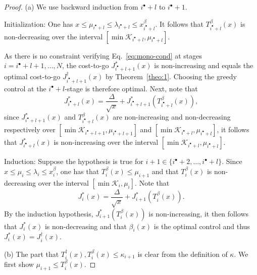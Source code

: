 \documentclass[journal]{IEEEtran}
\theoremstyle{plain}
\theoremstyle{definition}
\theoremstyle{definition}
\begin{document}
\begin{proof}
  (a) We use backward induction from $i^\bullet + l$ to
  $i^\bullet + 1$. %

  Initialization: One has
  $x \leq \mu_{i^\bullet + l} \leq \lambda_{i^\bullet + l} \leq
  x^\beta_{i^\bullet + l}$.
  It follows that $T_{i^\bullet + l}^{\beta}(x)$ is non-decreasing
  over the interval
  $[\min \mathcal{K}_{i^\bullet+l}, \mu_{i^\bullet+l}]$.

  As there is no constraint verifying Eq.~\eqref{eq:mono-cond} at
  stages $i=i^\bullet + l + 1, \dots, N$, the cost-to-go
  $J^*_{i^\bullet + l + 1}(x)$ is non-increasing and equals
  the optimal cost-to-go $J^\dagger_{i^\bullet + l + 1}(x)$
  by Theorem~\ref{theo:1}. Choosing the greedy control at the
  $i^\bullet+l$-stage is therefore optimal.  Next, note that
  \begin{equation}
    \label{eq:4b}
    J^{*}_{i^\bullet + l}(x) = \frac{\Delta}{\sqrt{x}}
    + J^{*}_{i^\bullet + l + 1}(T_{i^\bullet + l}^\beta(x)),
  \end{equation}
  since $J^{*}_{i^\bullet + l+1}(x)$ and
  $T_{i^\bullet + l}^{\beta}(x)$ are non-increasing and non-decreasing
  respectively over
  $[\min \mathcal{K}_{i^\bullet+l+1}, \mu_{i^\bullet+l+1}]$ and
  $[\min \mathcal{K}_{i^\bullet+l}, \mu_{i^\bullet+l}]$, it follows
  that $J^{*}_{i^\bullet + l}(x)$ is non-increasing over the
  interval $[\min \mathcal{K}_{i^\bullet + l}, \mu_{i^\bullet+l}]$.

  Induction: Suppose the hypothesis is true for
  $i+1 \in \{i^\bullet+2,\dots,i^\bullet+l\}$. Since
  $x \leq \mu_i \leq \lambda_i \leq x^\beta_i$, one has that
  $T_i^\beta(x) \leq \mu_{i+1}$ and that $T_i^{\beta}(x)$ is
  non-decreasing over the interval $[\min\mathcal{K}_i, \mu_i]$. Note
  that
  \begin{equation}
    \label{eq:5}
    J^*_{i}(x) = \frac{\Delta}{\sqrt{x}}
    + J^*_{i + 1}(T_{i}^\beta(x)).
  \end{equation}
  By the induction hypothesis, $J^{*}_{i + 1}(T_{i}^\beta(x))$
  is non-increasing, it then follows that $J^{*}_{i}(x) $ is
  non-decreasing and that $\beta_{i}(x)$ is the optimal control and thus
  $J_{i}^{*}(x) = J_{i}^\dagger(x)$.

  (b) The part that $T_i^\dagger(x), T_i^\beta(x) \leq \kappa_{i+1}$
  is clear from the definition of $\kappa$. We first show
  $\mu_{i+1} \leq T_i^\beta(x)$.


\end{proof}
\end{document}
